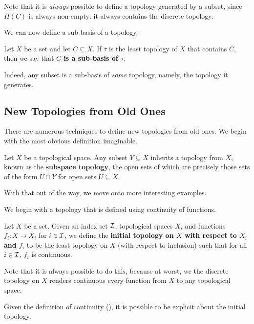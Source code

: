 Note that it is \textit{always} possible to define a topology generated by a subset, since $\Pi(C)$ is always non-empty: it always contains the discrete topology.

We can now define a sub-basis of a topology.

\begin{boxdefinition}
    Let $X$ be a set and let $C \subseteq X$. If $\tau$ is the least topology of $X$ that contains $C$, then we say that \textbf{$C$ is a sub-basis of $\tau$}.
\end{boxdefinition}

Indeed, any subset is a sub-basis of \textit{some} topology, namely, the topology it generates.

\subsection{New Topologies from Old Ones}

There are numerous techniques to define new topologies from old ones. We begin with the most obvious definition imaginable.

\begin{boxdefinition}
    Let $X$ be a topological space. Any subset $Y \subseteq X$ inherits a topology from $X$, known as the \textbf{subspace topology}, the open sets of which are precisely those sets of the form $U \cap Y$ for open sets $U \subseteq X$.
\end{boxdefinition}

With that out of the way, we move onto more interesting examples.

We begin with a topology that is defined using continuity of functions.

\begin{boxdefinition}\label{Ch1:Def:Init_Top}
    Let $X$ be a set. Given an index set $\mathcal{I}$, topological spaces $X_i$ and functions $f_i : X \to X_i$ for $i \in \mathcal{I}$, we define the \textbf{initial topology on $X$ with respect to $X_i$ and $f_i$} to be the least topology on $X$ (with respect to inclusion) such that for all $i \in \mathcal{I}$, $f_i$ is continuous.
\end{boxdefinition}

Note that it is always possible to do this, because at worst, we the discrete topology on $X$ renders continuous every function from $X$ to any topological space.

Given the definition of continuity (), it is possible to be explicit about the initial topology.

